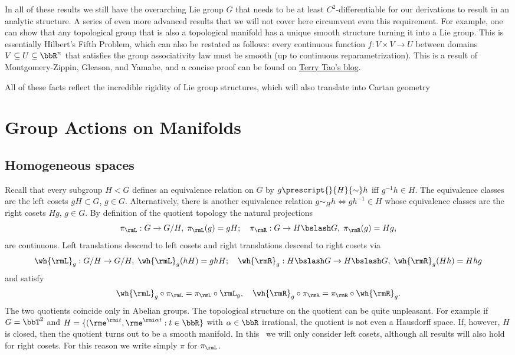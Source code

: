 \begin{rem}
    In all of these results we still have the overarching Lie group $G$ that needs to be at least $C^2$-differentiable for our derivations to result in an analytic structure. A series of even more advanced results that we will not cover here circumvent even this requirement. For example, one can show that any topological group that is also a topological manifold has a unique smooth structure turning it into a Lie group. This is essentially Hilbert's Fifth Problem, which can also be restated as follows: every continuous function $f:V\times V\to U$ between domains $V\subseteq U\subseteq \bbR^n$ that satisfies the group associativity law must be smooth (up to continuous reparametrization). This is a result of Montgomery-Zippin, Gleason, and Yamabe, and a concise proof can be found on \href{https://terrytao.wordpress.com/2011/06/17/hilberts-fifth-problem-and-gleason-metrics/}{Terry Tao's blog}.
\end{rem}

All of these facts reflect the incredible rigidity of Lie group structures, which will also translate into Cartan geometry








\clearpage
\chapter{Group Actions on Manifolds}


\section{Homogeneous spaces}\label{sec: homogeneous spaces}

Recall that every subgroup  $H<G$ defines an equivalence relation on $G$ by $g\prescript{}{H}{\sim}h$ iff $g^{-1}h\in H$. The equivalence classes are the left cosets $gH\subset G$, $g\in G$. Alternatively, there is another equivalence relation $g\sim_H h\Leftrightarrow gh^{-1}\in H$ whose equivalence classes are the right cosets $Hg$, $g\in G$.  By definition of the quotient topology the natural projections
\[\pi_\rmL:G\to G\slash H,\;\pi_\rmL(g)=gH;\quad \pi_\rmR:G\to H\bslash G,\;\pi_\rmR(g)=Hg,\]
are continuous. Left translations descend to left cosets and right translations descend to right cosets via
\[\wh{\rmL}_g:G\slash H\to G\slash H,\; \wh{\rmL}_g(hH)=ghH;\quad \wh{\rmR}_g: H\bslash G\to H\bslash G,\; \wh{\rmR}_g(Hh)=Hhg\]
and satisfy
\[\wh{\rmL}_g\circ \pi_\rmL=\pi_\rmL\circ \rmL_g,\quad \wh{\rmR}_g\circ \pi_\rmR=\pi_\rmR\circ \wh{\rmR}_g.\]
The two quotients coincide only in Abelian groups. The topological structure on the quotient can be quite unpleasant. For example if $G=\bbT^2$ and $H=\{(\rme^{\rmi t},\rme^{\rmi\alpha t}:t\in \bbR\}$ with $\alpha \in\bbR$ irrational, the quotient is not even a Hausdorff space. If, however, $H$ is closed, then the quotient turns out to be a smooth manifold. In this \sect\ we will only consider left cosets, although all results will also hold for right cosets. For this reason we write simply $\pi$ for $\pi_\rmL$.

